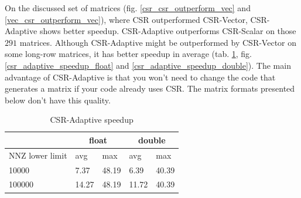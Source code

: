 \documentclass{article}
\begin{document}
On the discussed set of matrices (fig. \ref{csr_csr_outperform_vec} and \ref{vec_csr_outperform_vec}), where CSR outperformed CSR-Vector, CSR-Adaptive
shows better speedup. CSR-Adaptive outperforms CSR-Scalar on those $291$ matrices.
Although CSR-Adaptive might be outperformed by CSR-Vector on some long-row matrices, it has better speedup in average (tab. \ref{csr_vector_speedup_table}, 
fig. \ref{csr_adaptive_speedup_float} and \ref{csr_adaptive_speedup_double}). The main advantage of CSR-Adaptive is that you won't need to change
the code that generates a matrix if your code already uses CSR. The matrix formats presented below don't have this quality.

\begin{table}[H]
	\centering
	\begin{tabular}{ |p{2.6cm}||p{1cm}|p{1cm}|p{1cm}|p{1cm}|  }
	 \hline
		& \multicolumn{2}{|c|}{float} & \multicolumn{2}{|c|}{double}\\
	 \hline
	 NNZ lower limit & avg & max & avg & max  \\
	 \hline
	 10000  & 7.37  & 48.19 & 6.39 & 40.39 \\
	 100000 & 14.27 & 48.19 & 11.72 & 40.39 \\
	 \hline
	\end{tabular}
	\caption{CSR-Adaptive speedup}
  \label{csr_vector_speedup_table}
\end{table}

\begin{figure}[H]
\centering
{}
\qquad %
\end{figure}
\end{document}
